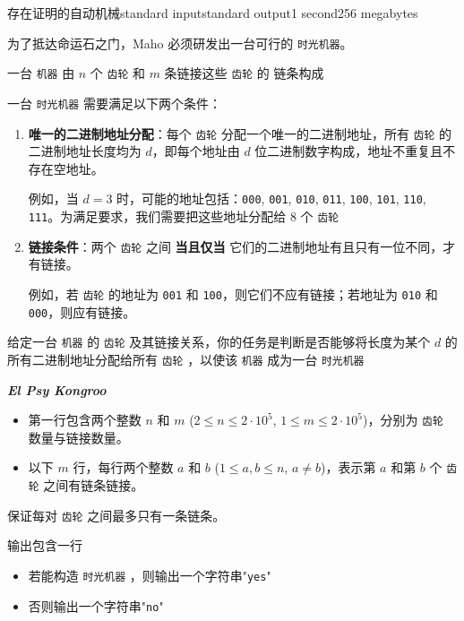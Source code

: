 \begin{problem}{存在证明的自动机械}{standard input}{standard output}{1 second}{256 megabytes}

为了抵达命运石之门，Maho 必须研发出一台可行的 \texttt{时光机器}。

一台 \texttt{机器} 由 \(n\) 个 \texttt{齿轮} 和 \(m\) 条链接这些 \texttt{齿轮} 的
链条构成

一台 \texttt{时光机器} 需要满足以下两个条件：

\begin{enumerate}
    \item \textbf{唯一的二进制地址分配}：每个 \texttt{齿轮} 分配一个唯一的二进制地址，所有 \texttt{齿轮} 的二进制地址长度均为 \(d\)，即每个地址由 \(d\) 位二进制数字构成，地址不重复且不存在空地址。

    例如，当 \(d = 3\) 时，可能的地址包括：\texttt{000}, \texttt{001}, \texttt{010}, \texttt{011}, \texttt{100}, \texttt{101}, \texttt{110}, \texttt{111}。为满足要求，我们需要把这些地址分配给 8 个 \texttt{齿轮}

    \item \textbf{链接条件}：两个 \texttt{齿轮} 之间 \textbf{当且仅当} 它们的二进制地址有且只有一位不同，才有链接。

    例如，若 \texttt{齿轮} 的地址为 \texttt{001} 和 \texttt{100}，则它们不应有链接；若地址为 \texttt{010} 和 \texttt{000}，则应有链接。
\end{enumerate}

给定一台 \texttt{机器} 的 \texttt{齿轮} 及其链接关系，你的任务是判断是否能够将长度为某个 $d$ 的所有二进制地址分配给所有 \texttt{齿轮} ，以使该 \texttt{机器} 成为一台 \texttt{时光机器}

\textbf{\textit{El Psy Kongroo}}


\InputFile

\begin{itemize}
    \item 第一行包含两个整数 \(n\) 和 \(m\) (\(2 \le n \le 2 \cdot 10^5\), \(1 \le m \le 2 \cdot 10^5\))，分别为 \texttt{齿轮} 数量与链接数量。
    \item 以下 \(m\) 行，每行两个整数 \(a\) 和 \(b\) (\(1 \le a, b \le n\), \(a \neq b\))，表示第 \(a\) 和第 \(b\) 个 \texttt{齿轮} 之间有链条链接。
\end{itemize}

保证每对 \texttt{齿轮} 之间最多只有一条链条。

\OutputFile

输出包含一行
\begin{itemize}
    \item
    若能构造 \texttt{时光机器} ，则输出一个字符串"\texttt{yes}"
    \item
    否则输出一个字符串"\texttt{no}"
\end{itemize}


\end{problem}
